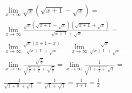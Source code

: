 \begin{ex}
\begin{align}
&\lim_{x\rightarrow \infty} \sqrt{x}(\sqrt{x+1}-\sqrt{x})=\nonumber\\
&\lim_{x\rightarrow \infty} \frac{\sqrt{x}(\sqrt{x+1}-\sqrt{x})(\sqrt{x+1}+\sqrt{x})}{\sqrt{x+1}+\sqrt{x}}=\nonumber\\
&\lim_{x\rightarrow \infty} \frac{\sqrt{x}(x+1-x)}{\sqrt{x+1}+\sqrt{x}}=\lim_{x\rightarrow \infty} \frac{\sqrt{x}}{\sqrt{x+1}+\sqrt{x}}=\nonumber\\
&\lim_{x\rightarrow \infty} \frac{\sqrt{\frac{x}{x}}}{\sqrt{\frac{x}{x}+\frac{1}{x}}+\sqrt{\frac{x}{x}}}=\lim_{x\rightarrow \infty} \frac{1}{\sqrt{1+\frac{1}{x}+}\sqrt{1}}=\nonumber\\
&\frac{1}{\sqrt{1+0}+\sqrt{1}}=\frac{1}{\sqrt{1}+\sqrt{1}}=\frac{1}{1+1}=\frac{1}{2}\nonumber
\end{align}
\end{ex}